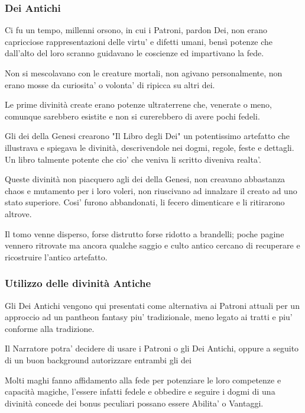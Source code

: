 \documentclass[a4paper,11pt,twoside,openany]{book}
\begin{document}
\pagebreak

\subsubsection*{Dei Antichi}

Ci fu un tempo, millenni orsono, in cui i Patroni, pardon Dei, non erano capricciose rappresentazioni delle virtu' e difetti umani, bensì potenze che dall'alto del loro scranno guidavano le coscienze ed impartivano la fede.

Non si mescolavano con le creature mortali, non agivano personalmente, non erano mosse da curiosita' o volonta' di ripicca su altri dei.

Le prime divinità create erano potenze ultraterrene che, venerate o meno, comunque sarebbero esistite e non si curerebbero di avere pochi fedeli.

Gli dei della Genesi crearono "Il Libro degli Dei" un potentissimo artefatto che illustrava e spiegava le divinità, descrivendole nei dogmi, regole, feste e dettagli.
Un libro talmente potente che cio' che veniva li scritto diveniva realta'.

Queste divinità non piacquero agli dei della Genesi, non creavano abbastanza chaos e mutamento per i loro voleri, non riuscivano ad innalzare il creato ad uno stato superiore.
Cosi' furono abbandonati, li fecero dimenticare e li ritirarono altrove.

Il tomo venne disperso, forse distrutto forse ridotto a brandelli; poche pagine vennero ritrovate ma ancora qualche saggio e culto antico cercano di recuperare e ricostruire l'antico artefatto.

\subsubsection{Utilizzo delle divinità Antiche}

Gli Dei Antichi vengono qui presentati come alternativa ai Patroni attuali per un approccio ad un pantheon  fantasy piu' tradizionale, meno legato ai tratti e piu' conforme alla tradizione.

Il Narratore potra' decidere di usare i Patroni o gli Dei Antichi, oppure a seguito di un buon background autorizzare entrambi gli dei

Molti maghi fanno affidamento alla fede per potenziare le loro competenze e capacità magiche, l'essere infatti fedele e obbedire e seguire i dogmi di una divinità concede dei bonus peculiari possano essere Abilita' o Vantaggi.
\end{document}
